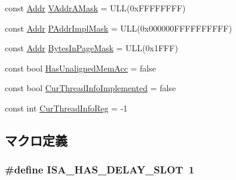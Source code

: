 \begin{DoxyCompactItemize}
\item 
const \hyperlink{base_2types_8hh_af1bb03d6a4ee096394a6749f0a169232}{Addr} \hyperlink{namespaceSparcISA_a23f8389b82b2ea7be78d3f123b91ec4c}{VAddrAMask} = ULL(0xFFFFFFFF)
\item 
const \hyperlink{base_2types_8hh_af1bb03d6a4ee096394a6749f0a169232}{Addr} \hyperlink{namespaceSparcISA_abb8b7685b079953e35015543262458e2}{PAddrImplMask} = ULL(0x000000FFFFFFFFFF)
\item 
const \hyperlink{base_2types_8hh_af1bb03d6a4ee096394a6749f0a169232}{Addr} \hyperlink{namespaceSparcISA_aa9425c8366e078ba79a7d9730ad25492}{BytesInPageMask} = ULL(0x1FFF)
\item 
const bool \hyperlink{namespaceSparcISA_a1c3adbc67ce574fe545e332d3bc677be}{HasUnalignedMemAcc} = false
\item 
const bool \hyperlink{namespaceSparcISA_a9faf3aac879cfa867d4ae15d4119c45e}{CurThreadInfoImplemented} = false
\item 
const int \hyperlink{namespaceSparcISA_a7e5bf2f33f34327efc1eeccbb0c1141f}{CurThreadInfoReg} = -\/1
\end{DoxyCompactItemize}


\subsection{マクロ定義}
\hypertarget{sparc_2isa__traits_8hh_aae21ac6833454e7ead9810c372658afc}{
\subsubsection[{ISA\_\-HAS\_\-DELAY\_\-SLOT}]{\setlength{\rightskip}{0pt plus 5cm}\#define ISA\_\-HAS\_\-DELAY\_\-SLOT~1}}
\label{sparc_2isa__traits_8hh_aae21ac6833454e7ead9810c372658afc}

